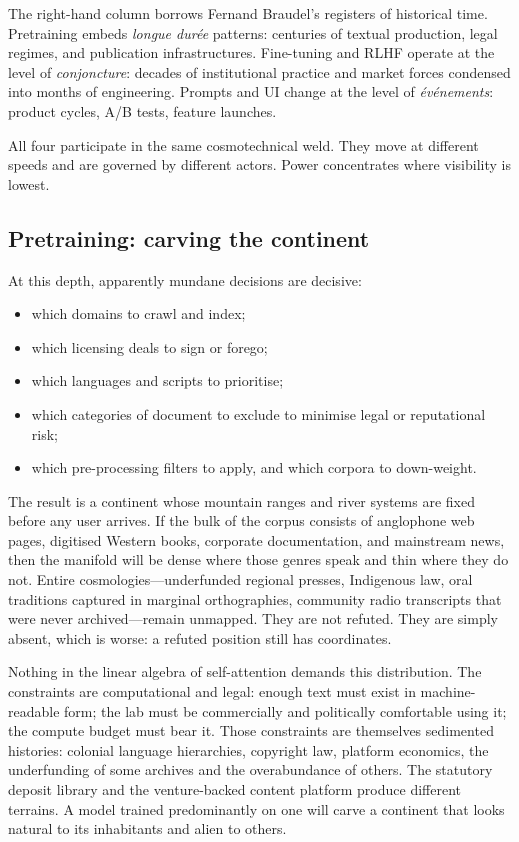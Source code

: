 \documentclass[12pt,a4paper]{article}
\begin{document}
The right-hand column borrows Fernand Braudel's registers of historical time. Pretraining embeds \emph{longue dur\'ee} patterns: centuries of textual production, legal regimes, and publication infrastructures. Fine-tuning and RLHF operate at the level of \emph{conjoncture}: decades of institutional practice and market forces condensed into months of engineering. Prompts and UI change at the level of \emph{\'ev\'enements}: product cycles, A/B tests, feature launches.

All four participate in the same cosmotechnical weld. They move at different speeds and are governed by different actors. Power concentrates where visibility is lowest.

\subsection{Pretraining: carving the continent}

At this depth, apparently mundane decisions are decisive:

\begin{itemize}
  \item which domains to crawl and index;
  \item which licensing deals to sign or forego;
  \item which languages and scripts to prioritise;
  \item which categories of document to exclude to minimise legal or reputational risk;
  \item which pre-processing filters to apply, and which corpora to down-weight.
\end{itemize}

The result is a continent whose mountain ranges and river systems are fixed before any user arrives. If the bulk of the corpus consists of anglophone web pages, digitised Western books, corporate documentation, and mainstream news, then the manifold will be dense where those genres speak and thin where they do not. Entire cosmologies---underfunded regional presses, Indigenous law, oral traditions captured in marginal orthographies, community radio transcripts that were never archived---remain unmapped. They are not refuted. They are simply absent, which is worse: a refuted position still has coordinates.

Nothing in the linear algebra of self-attention demands this distribution. The constraints are computational and legal: enough text must exist in machine-readable form; the lab must be commercially and politically comfortable using it; the compute budget must bear it. Those constraints are themselves sedimented histories: colonial language hierarchies, copyright law, platform economics, the underfunding of some archives and the overabundance of others. The statutory deposit library and the venture-backed content platform produce different terrains. A model trained predominantly on one will carve a continent that looks natural to its inhabitants and alien to others.
\end{document}
